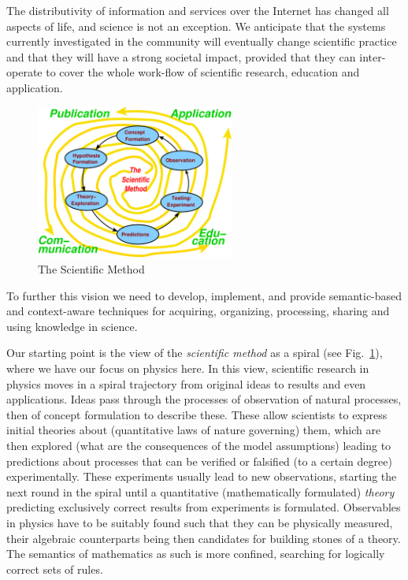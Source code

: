\documentclass{llncs}
\begin{document}
The distributivity of information and services over the Internet has changed all aspects
of life, and science is not an exception. We anticipate that the systems currently
investigated in the community will eventually change scientific practice and that they
will have a strong societal impact, provided that they can inter-operate to cover the
whole work-flow of scientific research, education and application.
\begin{figure}\vspace{-.6cm}
  \includegraphics[width=6.5cm]{sci-method}\vspace{-.3cm}
  \caption{The Scientific Method}\label{fig:nw-Methode}\vspace{-.6cm}
\end{figure}
To further this vision we need to develop, implement, and provide semantic-based and
context-aware techniques for acquiring, organizing, processing, sharing and using
knowledge in science.
 
Our starting point is the view of the {\emph{scientific method}} as a spiral (see
Fig.~\ref{fig:nw-Methode}), where we have our focus on physics here.  In this view,
scientific research in physics moves in a spiral trajectory from original ideas to results
and even applications. Ideas pass through the processes of observation of natural
processes, then of concept formulation to describe these. These allow scientists to
express initial theories about (quantitative laws of nature governing) them, which are
then explored (what are the consequences of the model assumptions) leading to predictions
about processes that can be verified or falsified (to a certain degree) experimentally.
These experiments usually lead to new observations, starting the next round in the spiral
until a quantitative (mathematically formulated) \textit{theory} predicting exclusively
correct results from experiments is formulated.  Observables in physics have to be
suitably found such that they can be physically measured, their algebraic counterparts
being then candidates for building stones of a theory.  The semantics of mathematics as
such is more confined, searching for logically correct sets of rules.
\end{document}
